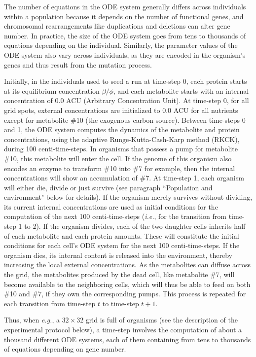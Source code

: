 The number of equations in the ODE system generally differs across individuals within a population because it depends on the number of functional genes, and chromosomal rearrangements like duplications and deletions can alter gene number. In practice, the size of the ODE system goes from tens to thousands of equations depending on the individual. Similarly, the parameter values of the ODE system also vary across individuals, as they are encoded in the organism's genes and thus result from the mutation process.

Initially, in the individuals used to seed a run at time-step 0, each protein starts at its equilibrium concentration $\beta/\phi$, and each metabolite starts with an internal concentration of 0.0 ACU (Arbitrary Concentration Unit). At time-step 0, for all grid spots, external concentrations are initialized to 0.0 ACU for all nutrients except for metabolite \#10 (the exogenous carbon source). Between time-steps 0 and 1, the ODE system computes the dynamics of the metabolite and protein concentrations, using the adaptive Runge-Kutta-Cash-Karp method (RKCK), during 100 centi-time-steps. In organisms that possess a pump for metabolite \#10, this metabolite will enter the cell. If the genome of this organism also encodes an enzyme to transform \#10 into \#7 for example, then the internal concentrations will show an accumulation of \#7. At time-step 1, each organism will either die, divide or just survive (see paragraph ``Population and environment" below for details). If the organism merely survives without dividing, its current internal concentrations are used as initial conditions for the computation of the next 100 centi-time-steps (\textit{i.e.}, for the transition from time-step 1 to 2). If the organism divides, each of the two daughter cells inherits half of each metabolite and each protein amounts. These will constitute the initial conditions for each cell's ODE system for the next 100 centi-time-steps. If the organism dies, its internal content is released into the environment, thereby increasing the local external concentrations. As the metabolites can diffuse across the grid, the metabolites produced by the dead cell, like metabolite \#7, will become available to the neighboring cells, which will thus be able to feed on both \#10 and \#7, if they own the corresponding pumps. This process is repeated for each transition from time-step $t$ to time-step $t+1$.

Thus, when \textit{e.g.}, a $32 \times 32$ grid is full of organisms (see the description of the experimental protocol below), a time-step involves the computation of about a thousand different ODE systems, each of them containing from tens to thousands of equations depending on gene number.

